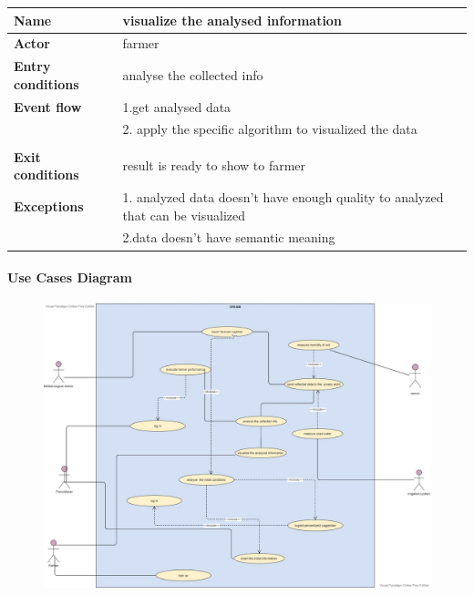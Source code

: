\begin{table}[H]
\begin{tabular}{|l|l|}
\hline
\normalsize	
\textbf{Name} & visualize the analysed information \\\hline
\textbf{Actor} & farmer\\\hline
\textbf{Entry conditions} &  analyse the collected info  \\\hline
\textbf{Event flow} & 1.get analysed data \\&
2. apply the specific algorithm to visualized the data\\&
\\\hline
\textbf{Exit conditions} & result is ready to show to farmer  \\\hline
\textbf{Exceptions }& 
1. analyzed data doesn't have enough quality to analyzed that can be visualized \\&
2.data doesn't have semantic meaning 
\\\hline
\end{tabular}
\end{table}

\paragraph{Use Cases Diagram}\hfill
           

\begin{figure}[H]
\includegraphics[width=1\textwidth]{figures/usecase.jpg}
\end{figure}
